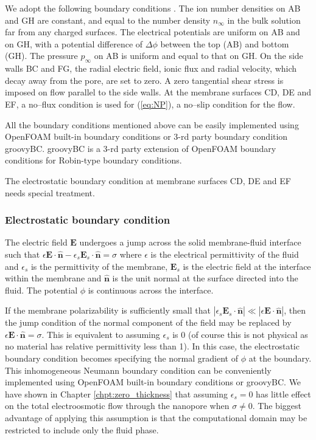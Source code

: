 We adopt the following boundary conditions \cite{Mao2013}. The ion number densities on AB and GH are constant, and equal to the number density $n_\infty$ in the bulk solution far from any charged surfaces. The electrical potentials are uniform on AB and on GH, with a potential difference of $\Delta\phi$ between the top (AB) and bottom (GH). The pressure $p_{\infty}$ on AB is uniform and equal to that on GH. On the side walls BC and FG, the radial electric field, ionic flux and radial velocity, which decay away from the pore, are set to zero. A zero tangential shear stress is imposed on flow parallel to the side walls. At the membrane surfaces CD, DE and EF, a no--flux condition is used for (\ref{eq:NP}), a no--slip condition for the flow. 

All the boundary conditions mentioned above can be easily implemented using OpenFOAM built-in boundary conditions or 3-rd party boundary condition \textsf{groovyBC}. \textsf{groovyBC} is a 3-rd party extension of OpenFOAM boundary conditions for Robin-type boundary conditions.

The electrostatic boundary condition at membrane surfaces CD, DE and EF needs special treatment.

\subsubsection{Electrostatic boundary condition}
The electric field $\mathbf{E}$ undergoes a jump across the solid membrane-fluid interface such that
$\epsilon \mathbf{E} \cdot  \hat{\mathbf{n}} - \epsilon_{s} \mathbf{E}_{s} \cdot \hat{\mathbf{n}} = \sigma$ 
where $\epsilon$ is the electrical permittivity of the fluid and $\epsilon_{s}$ is the permittivity of the membrane, $\mathbf{E}_{s}$ is the electric field at the interface within the membrane and $\hat{\mathbf{n}}$ is the unit normal at the surface directed into the fluid. The potential $\phi$ is continuous across the interface. 

If the membrane polarizability is sufficiently small that $|\epsilon_{s} \mathbf{E}_{s} \cdot \hat{\mathbf{n}}|\ll|\epsilon \mathbf{E} \cdot  \hat{\mathbf{n}}|$, then the jump condition of the normal component of the field may be replaced by $\epsilon \mathbf{E} \cdot \hat{\mathbf{n}} = \sigma$. This is equivalent to assuming $\epsilon_s$ is 0 (of course this is not physical as no material has relative permittivity less than 1). In this case, the electrostatic boundary condition becomes specifying the normal gradient of $\phi$ at the boundary. This inhomogeneous Neumann boundary condition can be conveniently implemented using OpenFOAM built-in boundary conditions or \textsf{groovyBC}. We have shown in Chapter \ref{chpt:zero_thickness} that assuming $\epsilon_s=0$ has little effect on the total electroosmotic flow through the nanopore when $\sigma \neq 0$. The biggest advantage of applying this assumption is that the computational domain may be restricted to include only the fluid phase.

